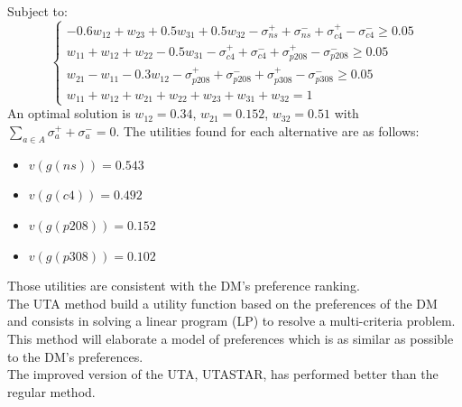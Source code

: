 \documentclass{report}
\begin{document}
Subject to: \\
\begin{equation}
\begin{cases}
-0.6w_{12} + w_{23} + 0.5w_{31} + 0.5w_{32} -\sigma _{ns}^{+} +\sigma _{ns}^{-} +\sigma _{c4}^{+} - \sigma _{c4}^{-} \geq 0.05\\
w_{11} + w_{12} + w_{22} - 0.5w_{31} -\sigma _{c4}^{+} +\sigma _{c4}^{-} +\sigma _{p208}^{+} - \sigma _{p208}^{-} \geq 0.05 \\
w_{21} - w_{11} - 0.3w_{12} -\sigma _{p208}^{+} +\sigma _{p208}^{-} +\sigma _{p308}^{+} - \sigma _{p308}^{-} \geq 0.05 \\
w_{11} + w_{12} + w_{21} + w_{22} + w_{23} + w_{31} + w_{32} = 1
\end{cases}
\end{equation}
An optimal solution is $w_{12} = 0.34$, $w_{21} = 0.152$, $w_{32} = 0.51$ with $\sum_{a \in A} \sigma _{a}^{+} + \sigma _{a}^{-} = 0$. The utilities found for each alternative are as follows: \\ 
\begin{itemize}
\item $v(g(ns)) = 0.543$
\item $v(g(c4)) = 0.492$
\item $v(g(p208)) = 0.152 $
\item $v(g(p308)) = 0.102 $
\end{itemize}
Those utilities are consistent with the DM's preference ranking. \\

The UTA method build a utility function based on the preferences of the DM and consists in solving a linear program (LP) to resolve a multi-criteria problem.\\
This method will elaborate a model of preferences which is as similar as possible to the DM's preferences.\\
The improved version of the UTA, UTASTAR, has performed better than the regular method.
\end{document}

